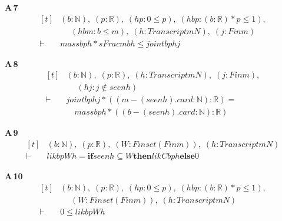 \noindent\textbf{A\,7}\quad{}
{\footnotesize\[ \begin{aligned}[t]
&(\mathit{b} : \mathbb{N} ),\; (\mathit{p} : \mathbb{R} ),\; (\mathit{hp} : 0 \leq \mathit{p}),\; (\mathit{hbp} : (\mathit{b} : \mathbb{R} ) * \mathit{p} \leq 1),\\
&\quad \; (\mathit{hbm} : \mathit{b} \leq \mathit{m}),\; (\mathit{h} : \mathit{Transcript} \mathit{m} \mathit{N}),\; (\mathit{j} : \mathit{Fin} \mathit{m})\\
\vdash\;&\mathit{mass} \mathit{b} \mathit{p} \mathit{h} * \mathit{sFrac} \mathit{m} \mathit{b} \mathit{h} \leq \mathit{joint} \mathit{b} \mathit{p} \mathit{h} \mathit{j}
\end{aligned} \]}

\noindent\textbf{A\,8}\quad{}
{\footnotesize\[ \begin{aligned}[t]
&(\mathit{b} : \mathbb{N} ),\; (\mathit{p} : \mathbb{R} ),\; (\mathit{h} : \mathit{Transcript} \mathit{m} \mathit{N}),\; (\mathit{j} : \mathit{Fin} \mathit{m}),\\
&\quad \; (\mathit{hj} : \mathit{j} \notin \mathit{seen} \mathit{h})\\
\vdash\;&\mathit{joint} \mathit{b} \mathit{p} \mathit{h} \mathit{j} * ((\mathit{m} - (\mathit{seen} \mathit{h}).\mathit{card} : \mathbb{N} ) : \mathbb{R} ) =\\
&\quad \mathit{mass} \mathit{b} \mathit{p} \mathit{h} * ((\mathit{b} - (\mathit{seen} \mathit{h}).\mathit{card} : \mathbb{N} ) : \mathbb{R} )
\end{aligned} \]}

\noindent\textbf{A\,9}\quad{}
{\footnotesize\[ \begin{aligned}[t]
&(\mathit{b} : \mathbb{N} ),\; (\mathit{p} : \mathbb{R} ),\; (\mathit{W} : \mathit{Finset} (\mathit{Fin} \mathit{m})),\; (\mathit{h} : \mathit{Transcript} \mathit{m} \mathit{N})\\
\vdash\;&\mathit{lik} \mathit{b} \mathit{p} \mathit{W} \mathit{h} = \mathbf{if} \mathit{seen} \mathit{h} \subseteq \mathit{W} \mathbf{then} \mathit{likC} \mathit{b} \mathit{p} \mathit{h} \mathbf{else} 0
\end{aligned} \]}

\noindent\textbf{A\,10}\quad{}
{\footnotesize\[ \begin{aligned}[t]
&(\mathit{b} : \mathbb{N} ),\; (\mathit{p} : \mathbb{R} ),\; (\mathit{hp} : 0 \leq \mathit{p}),\; (\mathit{hbp} : (\mathit{b} : \mathbb{R} ) * \mathit{p} \leq 1),\\
&\quad \; (\mathit{W} : \mathit{Finset} (\mathit{Fin} \mathit{m})),\; (\mathit{h} : \mathit{Transcript} \mathit{m} \mathit{N})\\
\vdash\;&0 \leq \mathit{lik} \mathit{b} \mathit{p} \mathit{W} \mathit{h}
\end{aligned} \]}

